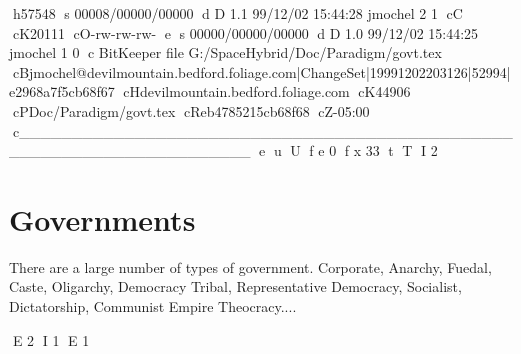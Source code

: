 h57548
s 00008/00000/00000
d D 1.1 99/12/02 15:44:28 jmochel 2 1
cC
cK20111
cO-rw-rw-rw-
e
s 00000/00000/00000
d D 1.0 99/12/02 15:44:25 jmochel 1 0
c BitKeeper file G:/SpaceHybrid/Doc/Paradigm/govt.tex
cBjmochel@devilmountain.bedford.foliage.com|ChangeSet|19991202203126|52994|e2968a7f5cb68f67
cHdevilmountain.bedford.foliage.com
cK44906
cPDoc/Paradigm/govt.tex
cReb4785215cb68f68
cZ-05:00
c______________________________________________________________________
e
u
U
f e 0
f x 33
t
T
I 2
\chapter{Governments }

There are a large number of types of government. 
Corporate, Anarchy, Fuedal, Caste, Oligarchy, Democracy
Tribal, Representative Democracy, Socialist, Dictatorship, Communist
Empire Theocracy....


E 2
I 1
E 1
